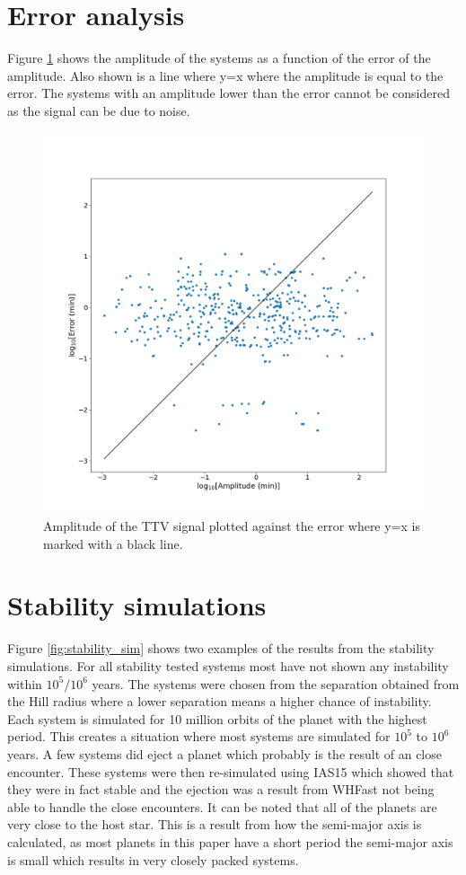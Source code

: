 \documentclass[12pt]{report}
\begin{document}
\section{Error analysis}
		Figure \ref{fig:amp_error} shows the amplitude of the systems as a function of the error of the amplitude. Also shown is a line where y=x where the amplitude is equal to the error. The systems with an amplitude lower than the error cannot be considered as the signal can be due to noise.
\begin{figure}
 	 \centering
	  \includegraphics[width=\textwidth]{img/ampErrorLog.png}
	  \caption{Amplitude of the TTV signal plotted against the error where y=x is marked with a black line.}
	 \label{fig:amp_error}
\end{figure}
\section{Stability simulations}
	Figure \ref{fig:stability_sim} shows two examples of the results from the stability simulations. For all stability tested systems most  have not shown any instability within $10^5 / 10^6$ years. The systems were chosen from the separation obtained from the Hill radius where a lower separation means a higher chance of instability. Each system is simulated for 10 million orbits of the planet with the highest period. This creates a situation where most systems are simulated for $10^5$ to $10^6$ years. A few systems did eject a planet which  probably is the result of an close encounter. These systems were then re-simulated using IAS15 which showed that they were in fact stable and the ejection was a result from WHFast not being able to handle the close encounters. It can be noted that all of the planets are very close to the host star. This is a result from how the semi-major axis is calculated, as most planets in this paper have a short period the semi-major axis is small which results in very closely packed systems.
\end{document}
